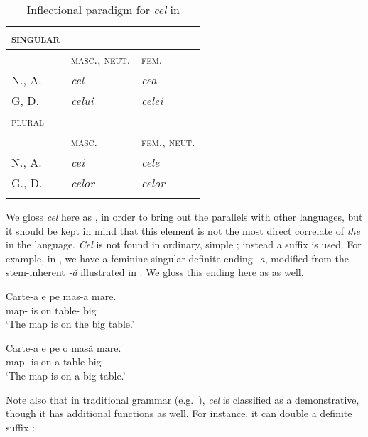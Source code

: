 \documentclass[output=paper
,modfonts
,nonflat]{langsci/langscibook}
\begin{document}
\begin{table}[bh]
\caption{Inflectional paradigm for \textit{cel} in }
\label{tab:coppockstrand:3}
\begin{tabularx}{0.55\textwidth}{ l X X }
\lsptoprule
\textsc{singular}\\\midrule
& \textsc{masc.}, \textsc{neut.} & \textsc{fem.}\\\midrule  
N., A. & \textit{cel} & \textit{cea}\\
G, D. & \textit{celui} & \textit{celei}\\\midrule
\textsc{plural}\\\midrule
& \textsc{masc.} & \textsc{fem.}, \textsc{neut.}\\\midrule
N., A. & \textit{cei} & \textit{cele}\\
G., D. & \textit{celor} & \textit{celor}\\\lspbottomrule
\end{tabularx}
\end{table}


We gloss \textit{cel} here as , in order to bring out the parallels with other  languages, but it should be kept in mind that this element is not the most direct correlate of  \textit{the} in the language. 
\textit{Cel} is not found in ordinary, simple ; instead a suffix is used. For example, in , we have a feminine singular definite ending \textit{-a}, modified from the stem-inherent \textit{-ă} illustrated in . We gloss this ending here as  as well.

\ea \label{ex:coppockstrand:30}
\begin{xlist}
\ex \label{ex:coppockstrand:30a}
\gll Carte-a e pe mas-a mare.\\
map- is on table- big\\
\glt `The map is on the big table.'

\ex \label{ex:coppockstrand:30b}
\gll Carte-a e pe o masă mare.\\
map- is on a table big\\
\glt `The map is on a big table.'
\end{xlist}
\z

Note also that in traditional grammar (e.g.\ \citealt{Cojocaru2003}), \textit{cel} is classified as a demonstrative, though it has additional functions as well. For instance, it can double a definite suffix \citep{Alexiadou2014}:
\end{document}
